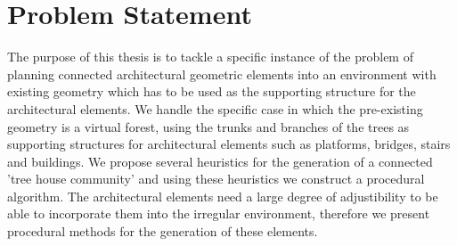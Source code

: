 \chapter{Problem Statement}
\label{sec:problem}


The purpose of this thesis is to tackle a specific instance of the problem of planning connected architectural geometric elements into an environment with existing geometry which has to be used as the supporting structure for the architectural elements. We handle the specific case in which the pre-existing geometry is a virtual forest, using the trunks and branches of the trees as supporting structures for architectural elements such as platforms, bridges, stairs and buildings. We propose several heuristics for the generation of a connected 'tree house community' and using these heuristics we construct a procedural algorithm. The architectural elements need a large degree of adjustibility to be able to incorporate them into the irregular environment, therefore we present procedural methods for the generation of these elements.       







